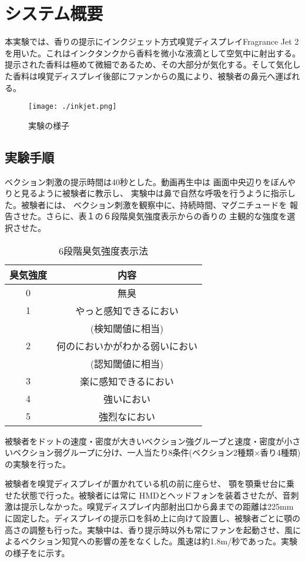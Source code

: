 \documentclass[uplatex]{jsarticle}   %
\begin{document}
\section{システム概要}
本実験では、香りの提示にインクジェット方式嗅覚ディスプレイFragrance Jet 2を用いた。これはインクタンクから香料を微小な液滴として空気中に射出する。提示された香料は極めて微細であるため、その大部分が気化する。そして気化した香料は嗅覚ディスプレイ後部にファンからの風により、被験者の鼻元へ運ばれる。

\begin{figure}[htbp]
 \centering
 \texttt{[image: ./inkjet.png]}
 \caption{実験の様子}\label{fig:inkjet}
\end{figure}

\subsection{実験手順}
ベクション刺激の提示時間は40秒とした。動画再生中は
画面中央辺りをぼんやりと見るように被験者に教示し、
実験中は鼻で自然な呼吸を行うように指示した。被験者には、
ベクション刺激を観察中に、持続時間、マグニチュードを
報告させた。さらに、表１の６段階臭気強度表示からの香りの
主観的な強度を選択させた。

\begin{table}[htbp]
 \centering
 \caption{6段階臭気強度表示法}
 \begin{tabular}{|c|c|}\hline
  臭気強度 & 内容 \\ \hline
  0 & 無臭 \\ \hline
  1 & やっと感知できるにおい\\
  & (検知閾値に相当)\\ \hline
  2 & 何のにおいかがわかる弱いにおい \\
  & (認知閾値に相当)\\ \hline
  3 & 楽に感知できるにおい \\ \hline
  4 & 強いにおい \\ \hline
  5 & 強烈なにおい \\ \hline
 \end{tabular}
\end{table}

被験者をドットの速度・密度が大きいベクション強グループと速度・密度が小さいベクション弱グループに分け、一人当たり8条件(ベクション2種類×香り4種類)の実験を行った。

被験者を嗅覚ディスプレイが置かれている机の前に座らせ、
顎を顎乗せ台に乗せた状態で行った。被験者には常に
HMDとヘッドフォンを装着させたが、音刺激は提示しなかった。嗅覚ディスプレイ内部射出口から鼻までの距離は225mmに固定した。ディスプレイの提示口を斜め上に向けて設置し、被験者ごとに顎の高さの調整も行った。実験中は、香り提示時以外も常にファンを起動させ、風によるベクション知覚への影響の差をなくした。風速は約1.8m/秒であった。実験の様子をに示す。
\end{document}
